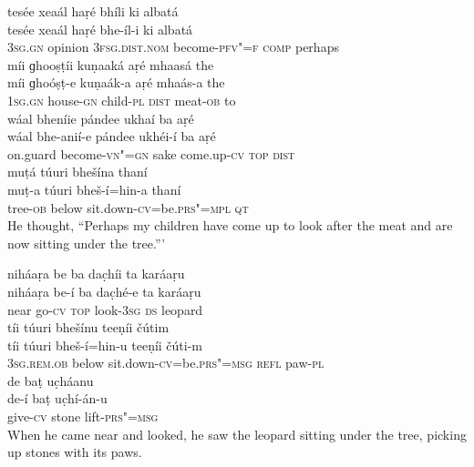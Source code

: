 \begin{exe}
\ex
\label{ex:11}
\glll tesée	xeaál	haṛé	bhíli	ki	albatá \\
tesée	xeaál	haṛé	bhe-íl-i	ki	albatá \\
\textsc{3sg.gn}	opinion \textsc{3fsg.dist.nom}	become-\textsc{pfv"=f} \textsc{comp}	perhaps \\
\glll míi	ɡhooṣṭíi	kuṇaaká	aṛé	mhaasá	the \\
míi	ɡhoóṣṭ-e	kuṇaák-a	aṛé	mhaás-a	the \\
\textsc{1sg.gn}	house-\textsc{gn}	child-\textsc{pl} \textsc{dist}	meat-\textsc{ob}	to \\
\glll wáal	bheníie	pándee	ukhaí	ba	aṛé \\
wáal	bhe-anií-e	pándee	ukhéi-í	ba	aṛé \\
on.guard	become-\textsc{vn"=gn}	sake	come.up-\textsc{cv} \textsc{top} \textsc{dist} \\
\glll muṭá	túuri	bhešína	thaní \\
muṭ-a	túuri	bheš-í=hin-a	thaní \\
tree-\textsc{ob}	below	sit.down-\textsc{cv}=be.\textsc{prs"=mpl} 	\textsc{qt} \\
\glt He thought, “Perhaps my children have come up to look after the meat and are now sitting under the tree.”'

\ex
\label{ex:12}
\glll niháaṛa	be	ba	dac̣híi	ta	karáaṛu \\
niháaṛa	be-í	ba	dac̣hé-e	ta	karáaṛu \\
near	go-\textsc{cv} \textsc{top}	look-\textsc{3sg} \textsc{ds}	leopard \\
\glll tíi	túuri	bhešínu	teeṇíi	čútim \\
tíi	túuri	bheš-í=hin-u	teeṇíi	čúti-m \\
\textsc{3sg.rem.ob}	below	sit.down-\textsc{cv}=be.\textsc{prs"=msg } \textsc{refl}	paw-\textsc{pl} \\
\glll de	baṭ	uc̣háanu \\
de-í	baṭ	uc̣hí-án-u \\
give-\textsc{cv}	stone	lift-\textsc{prs"=msg} \\
\glt When he came near and looked, he saw the leopard sitting under the tree, picking up stones with its paws.


\end{exe}
